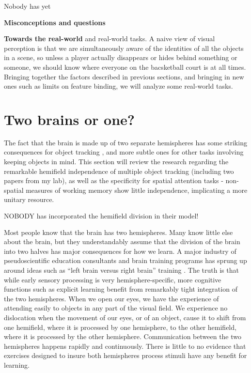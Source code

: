 \documentclass[]{book}
\begin{document}
Nobody has yet

\textbf{Misconceptions and questions}

\textbf{Towards the real-world} and real-world tasks. A naive view of visual perception is that we are simultaneously aware of the identities of all the objects in a scene, so unless a player actually disappears or hides behind something or someone, we should know where everyone on the bacsketball court is at all times. Bringing together the factors described in previous sections, and bringing in new ones such as limits on feature binding, we will analyze some real-world tasks.

\hypertarget{twoBrains}{%
\chapter{Two brains or one?}\label{twoBrains}}

The fact that the brain is made up of two separate hemispheres has some striking consequences for object tracking , and more subtle ones for other tasks involving keeping objects in mind. This section will review the research regarding the remarkable hemifield independence of multiple object tracking (including two papers from my lab), as well as the specificity for spatial attention tasks - non-spatial measures of working memory show little independence, implicating a more unitary resource.

NOBODY has incorporated the hemifield division in their model!

Most people know that the brain has two hemispheres. Many know little else about the brain, but they understandably assume that the division of the brain into two halves has major consequences for how we learn. A major industry of pseudoscientific education consultants and brain training programs has sprung up around ideas such as ``left brain versus right brain'' training \citep{kroezeBrainGymPseudoscientific2016}. The truth is that while early sensory processing is very hemisphere-specific, more cognitive functions such as explicit learning benefit from remarkably tight integration of the two hemispheres. When we open our eyes, we have the experience of attending easily to objects in any part of the visual field. We experience no dislocation when the movement of our eyes, or of an object, cause it to shift from one hemifield, where it is processed by one hemisphere, to the other hemifield, where it is processed by the other hemisphere. Communication between the two hemispheres happens rapidly and continuously. There is little to no evidence that exercises designed to insure both hemispheres process stimuli have any benefit for learning.
\end{document}
